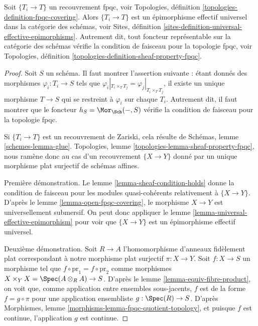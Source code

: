 \begin{lemma}
\label{lemma-fpqc-universal-effective-epimorphisms}
Soit $\{T_i \to T\}$ un recouvrement fpqc, voir Topologies, définition
\ref{topologies-definition-fpqc-covering}.
Alors $\{T_i \to T\}$ est un épimorphisme effectif universel dans la catégorie
des schémas, voir Sites, définition
\ref{sites-definition-universal-effective-epimorphisms}.
Autrement dit, tout foncteur représentable sur la catégorie des schémas
vérifie la condition de faisceau pour la topologie fpqc, voir Topologies,
définition \ref{topologies-definition-sheaf-property-fpqc}.
\end{lemma}

\begin{proof}
Soit $S$ un schéma. Il faut montrer l'assertion suivante : étant donnés des
morphismes $\varphi_i : T_i \to S$ tels que
$\varphi_i|_{T_i \times_T T_j} = \varphi_j|_{T_i \times_T T_j}$, il existe un
unique morphisme $T \to S$ qui se restreint à $\varphi_i$ sur chaque $T_i$.
Autrement dit, il faut montrer que le foncteur
$h_S = \Mor_{\Sch}( - , S)$ vérifie la condition de faisceau pour la topologie
fpqc.

\medskip\noindent
Si $\{T_i \to T\}$ est un recouvrement de Zariski, cela résulte de Schémas,
lemme \ref{schemes-lemma-glue}. Topologies, lemme
\ref{topologies-lemma-sheaf-property-fpqc}, nous ramène donc au cas d'un
recouvrement $\{X \to Y\}$ donné par un unique morphisme plat surjectif de
schémas affines.

\medskip\noindent
Première démonstration. Le lemme \ref{lemma-sheaf-condition-holds} donne la
condition de faisceau pour les modules quasi-cohérents relativement à
$\{X \to Y\}$. D'après le lemme \ref{lemma-open-fpqc-covering}, le morphisme
$X \to Y$ est universellement submersif. On peut donc appliquer le lemme
\ref{lemma-universal-effective-epimorphism} pour voir que $\{X \to Y\}$ est un
épimorphisme effectif universel.

\medskip\noindent
Deuxième démonstration. Soit $R \to A$ l'homomorphisme d'anneaux fidèlement
plat correspondant à notre morphisme plat surjectif $\pi : X \to Y$.
Soit $f : X \to S$ un morphisme tel que
$f \circ \text{pr}_1 = f \circ \text{pr}_2$ comme morphismes
$X \times_Y X = \Spec(A \otimes_R A) \to S$.
D'après le lemme \ref{lemma-equiv-fibre-product}, on voit que, comme
application entre ensembles sous-jacents, $f$ est de la forme
$f = g \circ \pi$ pour une application ensembliste
$g : \Spec(R) \to S$. D'après Morphismes, lemme
\ref{morphisms-lemma-fpqc-quotient-topology}, et puisque $f$ est continue,
l'application $g$ est continue.


\end{proof}
